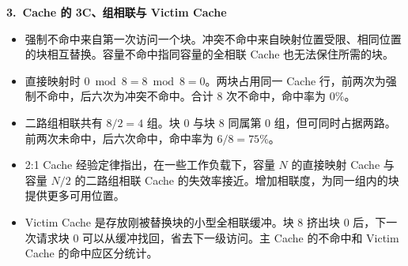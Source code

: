 \documentclass[zihao=-4,a4paper,fontset=windows]{ctexart}
\begin{document}
\medskip
\noindent\textbf{3.\ Cache 的 3C、组相联与 Victim Cache}
\begin{itemize}
\item 强制不命中来自第一次访问一个块。冲突不命中来自映射位置受限、相同位置的块相互替换。容量不命中指同容量的全相联 Cache 也无法保住所需的块。
\item 直接映射时 $0\bmod8=8\bmod8=0$。两块占用同一 Cache 行，前两次为强制不命中，后六次为冲突不命中。合计 8 次不命中，命中率为 $0\%$。
\item 二路组相联共有 $8/2=4$ 组。块 0 与块 8 同属第 0 组，但可同时占据两路。前两次未命中，后六次命中，命中率为 $6/8=75\%$。
\item 2:1 Cache 经验定律指出，在一些工作负载下，容量 $N$ 的直接映射 Cache 与容量 $N/2$ 的二路组相联 Cache 的失效率接近。增加相联度，为同一组内的块提供更多可用位置。
\item Victim Cache 是存放刚被替换块的小型全相联缓冲。块 8 挤出块 0 后，下一次请求块 0 可以从缓冲找回，省去下一级访问。主 Cache 的不命中和 Victim Cache 的命中应区分统计。
\end{itemize}
\end{document}
